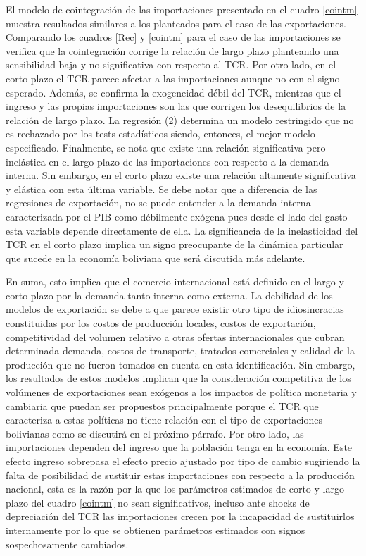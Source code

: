\documentclass[12pt,letterpaper]{article}
\begin{document}
El modelo de cointegración de las importaciones presentado en el cuadro \ref{cointm} muestra resultados similares a los planteados para el caso de las exportaciones. Comparando los cuadros \ref{Rec} y \ref{cointm} para el caso de las importaciones se verifica que la cointegración corrige la relación de largo plazo planteando una sensibilidad baja y no significativa con respecto al TCR. Por otro lado, en el corto plazo el TCR parece afectar a las importaciones aunque no con el signo esperado. Además, se confirma la exogeneidad débil del TCR, mientras que el ingreso y las propias importaciones son las que corrigen los desequilibrios de la relación de largo plazo. La regresión (2) determina un modelo restringido que no es rechazado por los tests estadísticos siendo, entonces, el mejor modelo especificado. Finalmente, se nota que existe una relación significativa pero inelástica en el largo plazo de las importaciones con respecto a la demanda interna. Sin embargo, en el corto plazo existe una relación altamente significativa y elástica con esta última variable. Se debe notar que a diferencia de las regresiones de exportación, no se puede entender a la demanda interna caracterizada por el PIB como débilmente exógena pues desde el lado del gasto esta variable depende directamente de ella. La significancia de la inelasticidad del TCR en el corto plazo implica un signo preocupante de la dinámica particular que sucede en la economía boliviana que será discutida más adelante.

En suma, esto implica que el comercio internacional está definido en el largo y corto plazo por la demanda tanto interna como externa. La debilidad de los modelos de exportación se debe a que parece existir otro tipo de idiosincracias constituidas por los costos de producción locales, costos de exportación, competitividad del volumen relativo a otras ofertas internacionales que cubran determinada demanda, costos de transporte, tratados comerciales y calidad de la producción que no fueron tomados en cuenta en esta identificación. Sin embargo, los resultados de estos modelos implican que la consideración competitiva de los volúmenes de exportaciones sean exógenos a los impactos de política monetaria y cambiaria que puedan ser propuestos principalmente porque el TCR que caracteriza a estas políticas no tiene relación con el tipo de exportaciones bolivianas como se discutirá en el próximo párrafo. Por otro lado, las importaciones dependen del ingreso que la población tenga en la economía. Este efecto ingreso sobrepasa el efecto precio ajustado por tipo de cambio sugiriendo la falta de posibilidad de sustituir estas importaciones con respecto a la producción nacional, esta es la razón por la que los parámetros estimados de corto y largo plazo del cuadro \ref{cointm} no sean significativos, incluso ante shocks de depreciación del TCR las importaciones crecen por la incapacidad de sustituirlos internamente por lo que se obtienen parámetros estimados con signos sospechosamente cambiados.
\end{document}
